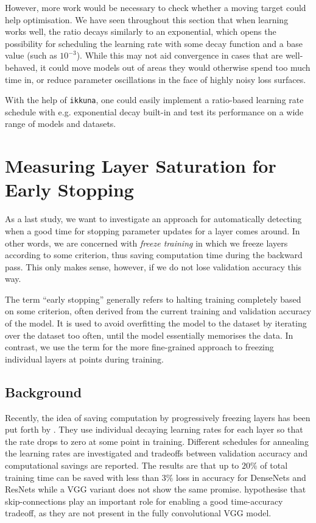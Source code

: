 However, more work would be necessary to check whether a moving target could
help optimisation. We have seen throughout this section that  when learning works
well, the ratio decays similarly to an exponential, which opens the
possibility for scheduling the learning rate with some decay function and a base
value (such as $10^{-3}$).  While this may not aid convergence in cases that are
well-behaved, it could move models out of areas they would otherwise spend too
much time in, or reduce parameter oscillations in the face of highly noisy loss
surfaces.

With the help of \texttt{ikkuna}, one could easily implement a ratio-based
learning rate schedule with e.g. exponential decay built-in and test its
performance on a wide range of models and datasets.

\section{Measuring Layer Saturation for Early Stopping}%
\label{sec:detecting_layer_saturation}

As a last study, we want to investigate an approach for automatically detecting
when a good time for stopping parameter updates for a layer comes around. In
other words, we are concerned with \emph{freeze training} in which we freeze
layers according to some criterion, thus saving computation time during the
backward pass. This only makes sense, however, if we do not lose validation
accuracy this way.

The term ``early stopping'' generally refers to halting training completely
based on some criterion, often derived from the current training and validation
accuracy of the model. It is used to avoid overfitting the model to the dataset
by iterating over the dataset too often, until the model essentially memorises
the data. In contrast, we use the term for the more fine-grained approach to
freezing individual layers at points during training.

\subsection{Background}%
\label{sub:saturation-background}

Recently, the idea of saving computation by progressively freezing layers has
been put forth by \citet{brock2017freezeout}. They use individual decaying
learning rates for each layer so that the rate drops to zero at some point in
training. Different schedules for annealing the learning rates are investigated
and tradeoffs between validation accuracy and computational savings are
reported. The results are that up to $20\%$ of total training time can be saved
with less than $3\%$ loss in accuracy for DenseNets \citep{huang2017densely} and
ResNets \citep{he2016deep} while a VGG variant does not show the same promise.
\citeauthor{brock2017freezeout} hypothesise that skip-connections play an
important role for enabling a good time-accuracy tradeoff, as they are not
present in the fully convolutional VGG model.

